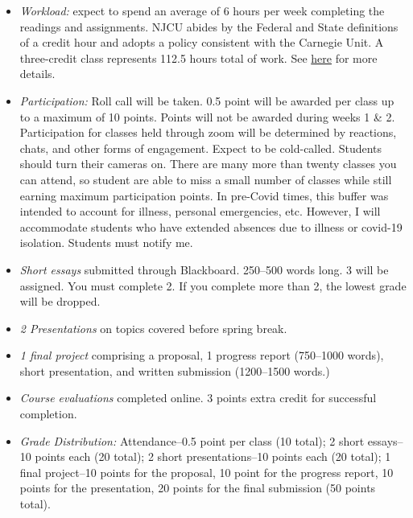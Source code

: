 \documentclass[article,oneside]{memoir}
\begin{document}
\begin{itemize}


\item \textit{Workload:} expect to spend an average of 6 hours per week completing the readings and assignments. NJCU abides by the Federal and State definitions of a credit hour and adopts a policy consistent with the Carnegie Unit. A three-credit class represents 112.5 hours total of work. See \href{http://scottoconnor.org/resources/Credit.pdf}{here} for more details.

\item \textit{Participation:} Roll call will be taken. 0.5 point will be awarded per class up to a maximum of 10 points. Points will not be awarded during weeks 1 \& 2. Participation for classes held through zoom will be determined by reactions, chats, and other forms of engagement. Expect to be cold-called. Students should turn their cameras on. There are many more than twenty classes you can attend, so student are able to miss a small number of classes while still earning maximum participation points. In pre-Covid times, this buffer was intended to account for illness, personal emergencies, etc. However, I will accommodate students who have extended absences due to illness or covid-19 isolation. Students must notify me. 


\item \textit{Short essays} submitted through Blackboard. 250--500 words long. 3 will be assigned. You must complete 2. If you complete more than 2, the lowest grade will be dropped.
 
\item \textit{2 Presentations} on topics covered before spring break.   

\item \textit{1 final project} comprising a proposal, 1 progress report (750--1000 words), short presentation, and written submission (1200--1500 words.)

\item \textit{Course evaluations} completed online. 3 points extra credit for successful completion.


\item \textit{Grade Distribution:} Attendance--0.5 point per class (10 total); 2 short essays--10 points each (20 total); 2 short presentations--10 points each (20 total); 1 final project--10 points for the proposal, 10 point for the progress report, 10 points for the presentation, 20 points for the final submission (50 points total).





\end{itemize}
\end{document}
